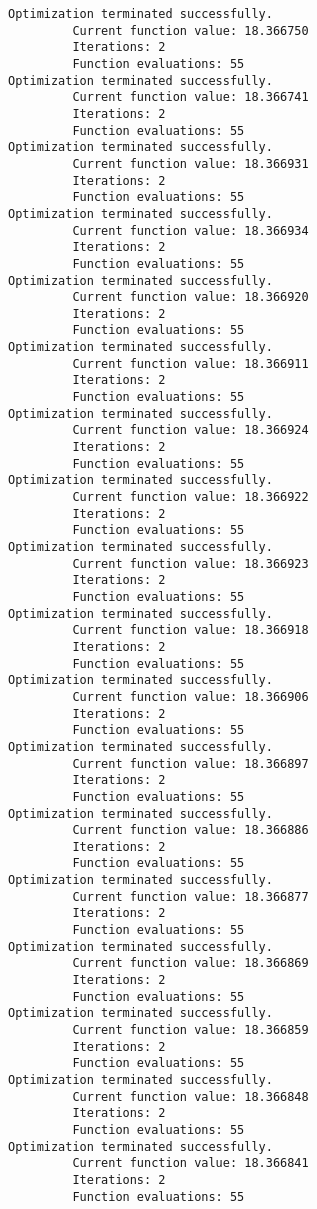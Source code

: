 \documentclass[11pt]{article}
\begin{document}
    \begin{Verbatim}[commandchars=\\\{\}]
Optimization terminated successfully.
         Current function value: 18.366750
         Iterations: 2
         Function evaluations: 55
Optimization terminated successfully.
         Current function value: 18.366741
         Iterations: 2
         Function evaluations: 55
Optimization terminated successfully.
         Current function value: 18.366931
         Iterations: 2
         Function evaluations: 55
Optimization terminated successfully.
         Current function value: 18.366934
         Iterations: 2
         Function evaluations: 55
Optimization terminated successfully.
         Current function value: 18.366920
         Iterations: 2
         Function evaluations: 55
Optimization terminated successfully.
         Current function value: 18.366911
         Iterations: 2
         Function evaluations: 55
Optimization terminated successfully.
         Current function value: 18.366924
         Iterations: 2
         Function evaluations: 55
Optimization terminated successfully.
         Current function value: 18.366922
         Iterations: 2
         Function evaluations: 55
Optimization terminated successfully.
         Current function value: 18.366923
         Iterations: 2
         Function evaluations: 55
Optimization terminated successfully.
         Current function value: 18.366918
         Iterations: 2
         Function evaluations: 55
Optimization terminated successfully.
         Current function value: 18.366906
         Iterations: 2
         Function evaluations: 55
Optimization terminated successfully.
         Current function value: 18.366897
         Iterations: 2
         Function evaluations: 55
Optimization terminated successfully.
         Current function value: 18.366886
         Iterations: 2
         Function evaluations: 55
Optimization terminated successfully.
         Current function value: 18.366877
         Iterations: 2
         Function evaluations: 55
Optimization terminated successfully.
         Current function value: 18.366869
         Iterations: 2
         Function evaluations: 55
Optimization terminated successfully.
         Current function value: 18.366859
         Iterations: 2
         Function evaluations: 55
Optimization terminated successfully.
         Current function value: 18.366848
         Iterations: 2
         Function evaluations: 55
Optimization terminated successfully.
         Current function value: 18.366841
         Iterations: 2
         Function evaluations: 55

\end{Verbatim}
\end{document}
